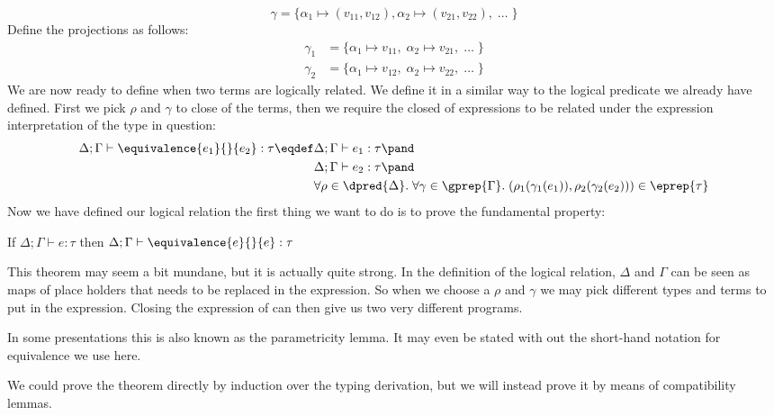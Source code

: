 \[
  \gamma = \{\alpha_1 \mapsto (v_{11},v_{12}), \alpha_2 \mapsto (v_{21},v_{22}),\; \dots\; \}
\]
Define the projections as follows:
\begin{align*}
  \gamma_1 & = \{\alpha_1 \mapsto v_{11}, \; \alpha_2 \mapsto v_{21},\; \dots \;\} \\
  \gamma_2 & = \{\alpha_1 \mapsto v_{12}, \; \alpha_2 \mapsto v_{22},\; \dots \;\}
\end{align*}
We are now ready to define when two terms are logically related. We define it in a similar way to the logical predicate we already have defined. First we pick $\rho$ and $\gamma$ to close of the terms, then we require the closed of expressions to be related under the expression interpretation of the type in question:
\renewcommand{\lreq}[2]{\equivalence{#1}{}{#2}}
\begin{align*}
  \Delta ; \Gamma \vdash \lreq{e_1}{e_2} : \tau \eqdef & \Delta ; \Gamma \vdash e_1 : \tau \pand\\
                                                      & \Delta ; \Gamma \vdash e_2 : \tau \pand \\
                                                      & \forall \rho \in \dpred{\Delta}. \; \forall \gamma \in \gprep{\Gamma}. \; (\rho_1(\gamma_1(e_1)),\rho_2(\gamma_2(e_2))) \in \eprep{\tau}
\end{align*}
Now we have defined our logical relation the first thing we want to do is to prove the fundamental property:
\begin{fundamentalprop}
  If $\Delta; \Gamma \vdash e : \tau$ then $\Delta; \Gamma \vdash \lreq{e}{e} : \tau$
\end{fundamentalprop}
This theorem may seem a bit mundane, but it is actually quite strong. In the definition of the logical relation, $\Delta$ and $\Gamma$ can be seen as maps of place holders that needs to be replaced in the expression. So when we choose a $\rho$ and $\gamma$ we may pick different types and terms to put in the expression. Closing the expression of can then give us two very different programs.

In some presentations this is also known as the parametricity lemma. It may even be stated with out the short-hand notation for equivalence we use here.

We could prove the theorem directly by induction over the typing derivation, but we will instead prove it by means of compatibility lemmas.
